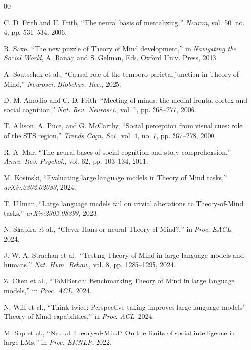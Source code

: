 \documentclass[conference]{IEEEtran}
\begin{document}
\begin{thebibliography}{00}

 C. D. Frith and U. Frith, ``The neural basis of mentalizing,'' \textit{Neuron}, vol. 50, no. 4, pp. 531--534, 2006.

 R. Saxe, ``The new puzzle of Theory of Mind development,'' in \textit{Navigating the Social World}, A. Banaji and S. Gelman, Eds. Oxford Univ. Press, 2013.

 A. Soutschek et al., ``Causal role of the temporo-parietal junction in Theory of Mind,'' \textit{Neurosci. Biobehav. Rev.}, 2025.

 D. M. Amodio and C. D. Frith, ``Meeting of minds: the medial frontal cortex and social cognition,'' \textit{Nat. Rev. Neurosci.}, vol. 7, pp. 268--277, 2006.

 T. Allison, A. Puce, and G. McCarthy, ``Social perception from visual cues: role of the STS region,'' \textit{Trends Cogn. Sci.}, vol. 4, no. 7, pp. 267--278, 2000.

 R. A. Mar, ``The neural bases of social cognition and story comprehension,'' \textit{Annu. Rev. Psychol.}, vol. 62, pp. 103--134, 2011.

 M. Kosinski, ``Evaluating large language models in Theory of Mind tasks,'' \textit{arXiv:2302.02083}, 2024.

 T. Ullman, ``Large language models fail on trivial alterations to Theory-of-Mind tasks,'' \textit{arXiv:2302.08399}, 2023.

 N. Shapira et al., ``Clever Hans or neural Theory of Mind?,'' in \textit{Proc. EACL}, 2024.

 J. W. A. Strachan et al., ``Testing Theory of Mind in large language models and humans,'' \textit{Nat. Hum. Behav.}, vol. 8, pp. 1285--1295, 2024.

 Z. Chen et al., ``ToMBench: Benchmarking Theory of Mind in large language models,'' in \textit{Proc. ACL}, 2024.

 N. Wilf et al., ``Think twice: Perspective-taking improves large language models' Theory-of-Mind capabilities,'' in \textit{Proc. ACL}, 2024.

 M. Sap et al., ``Neural Theory-of-Mind? On the limits of social intelligence in large LMs,'' in \textit{Proc. EMNLP}, 2022.


\end{thebibliography}
\end{document}
